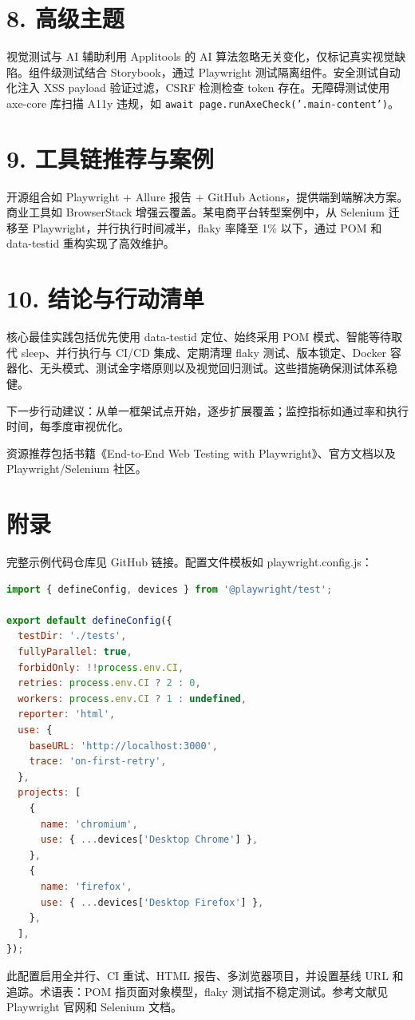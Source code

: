 \chapter{8. 高级主题}
视觉测试与 AI 辅助利用 Applitools 的 AI 算法忽略无关变化，仅标记真实视觉缺陷。组件级测试结合 Storybook，通过 Playwright 测试隔离组件。安全测试自动化注入 XSS payload 验证过滤，CSRF 检测检查 token 存在。无障碍测试使用 axe-core 库扫描 A11y 违规，如 \texttt{await page.runAxeCheck('.main-content')}。\par
\chapter{9. 工具链推荐与案例}
开源组合如 Playwright + Allure 报告 + GitHub Actions，提供端到端解决方案。商业工具如 BrowserStack 增强云覆盖。某电商平台转型案例中，从 Selenium 迁移至 Playwright，并行执行时间减半，flaky 率降至 1\%{} 以下，通过 POM 和 data-testid 重构实现了高效维护。\par
\chapter{10. 结论与行动清单}
核心最佳实践包括优先使用 data-testid 定位、始终采用 POM 模式、智能等待取代 sleep、并行执行与 CI/CD 集成、定期清理 flaky 测试、版本锁定、Docker 容器化、无头模式、测试金字塔原则以及视觉回归测试。这些措施确保测试体系稳健。\par
下一步行动建议：从单一框架试点开始，逐步扩展覆盖；监控指标如通过率和执行时间，每季度审视优化。\par
资源推荐包括书籍《End-to-End Web Testing with Playwright》、官方文档以及 Playwright/Selenium 社区。\par
\chapter{附录}
完整示例代码仓库见 GitHub 链接。配置文件模板如 playwright.config.js：\par
\begin{lstlisting}[language=javascript]
import { defineConfig, devices } from '@playwright/test';

export default defineConfig({
  testDir: './tests',
  fullyParallel: true,
  forbidOnly: !!process.env.CI,
  retries: process.env.CI ? 2 : 0,
  workers: process.env.CI ? 1 : undefined,
  reporter: 'html',
  use: {
    baseURL: 'http://localhost:3000',
    trace: 'on-first-retry',
  },
  projects: [
    {
      name: 'chromium',
      use: { ...devices['Desktop Chrome'] },
    },
    {
      name: 'firefox',
      use: { ...devices['Desktop Firefox'] },
    },
  ],
});
\end{lstlisting}
此配置启用全并行、CI 重试、HTML 报告、多浏览器项目，并设置基线 URL 和追踪。术语表：POM 指页面对象模型，flaky 测试指不稳定测试。参考文献见 Playwright 官网和 Selenium 文档。\par
